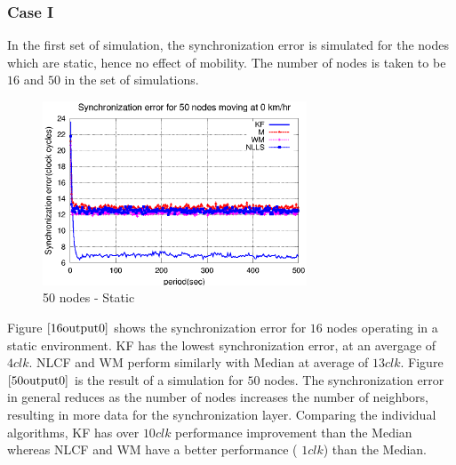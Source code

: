 \documentclass[a4paper,10pt]{report}
\begin{document}
\subsubsection{\textbf{Case I}} In the first set of simulation, the
synchronization error is simulated for the nodes which are static,
hence no effect of mobility. The number of nodes is taken to be $16$
and $50$ in the set of simulations.  \newline
\begin{figure}
\centering
\includegraphics[width=0.7\textwidth]{50output-s0}
\caption{50 nodes - Static} \label{50output0}
\end{figure}
Figure $\ref{16output0}$ shows the synchronization error for $16$
nodes operating in a static environment. KF has the lowest
synchronization error, at an avergage of $4clk$. NLCF and WM perform
similarly with Median at average of $13clk$. \newline Figure
$\ref{50output0}$ is the result of a simulation for $50$ nodes. The
synchronization error in general reduces as the number of nodes
increases the number of neighbors, resulting in more data for the
synchronization layer. Comparing the individual algorithms, KF has
over $10clk$ performance improvement than the Median whereas NLCF
and WM have a better performance ( $1clk$) than the Median.
\end{document}
